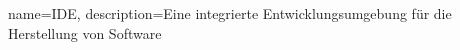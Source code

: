 {
	name=IDE,
	description={Eine integrierte Entwicklungsumgebung für die Herstellung von Software}
}